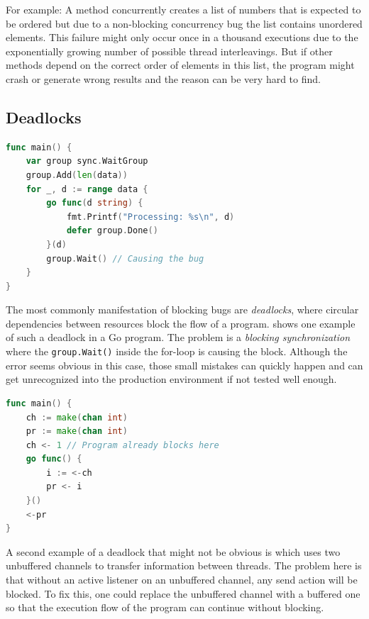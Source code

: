 \documentclass[conference]{IEEEtran}
\begin{document}
For example: A method concurrently creates a list of numbers that is expected to be ordered but due to a non-blocking concurrency bug the list contains unordered elements.
This failure might only occur once in a thousand executions due to the exponentially growing number of possible thread interleavings.
But if other methods depend on the correct order of elements in this list, the program might crash or generate wrong results and the reason can be very hard to find.

\subsection{Deadlocks}
\begin{lstlisting}[float=h, language=Go, label=lst:deadlockWG, caption=Deadlock caused by waiting for the \emph{WaitGroup} at a wrong location -- based on \cite{tu2019go}]
func main() {
    var group sync.WaitGroup
    group.Add(len(data))
    for _, d := range data {
        go func(d string) {
            fmt.Printf("Processing: %s\n", d)
            defer group.Done()
        }(d)
        group.Wait() // Causing the bug
    }
}
\end{lstlisting}

The most commonly manifestation of blocking bugs are \emph{deadlocks}, where circular dependencies between resources block the flow of a program.
 shows one example of such a deadlock in a Go program.
The problem is a \emph{blocking synchronization} where the \lstinline{group.Wait()} inside the for-loop is causing the block.
Although the error seems obvious in this case, those small mistakes can quickly happen and can get unrecognized into the production environment if not tested well enough.

\begin{lstlisting}[float=h, language=Go, label=lst:deadlockCh, caption={Deadlock caused by misuse of an \emph{unbuffered Channel}}]
func main() {
    ch := make(chan int)
    pr := make(chan int)
    ch <- 1 // Program already blocks here
    go func() {
        i := <-ch
        pr <- i
    }()
    <-pr
}
\end{lstlisting}

A second example of a deadlock that might not be obvious is  which uses two unbuffered channels to transfer information between threads.
The problem here is that without an active listener on an unbuffered channel, any send action will be blocked.
To fix this, one could replace the unbuffered channel with a buffered one so that the execution flow of the program can continue without blocking.
\end{document}
